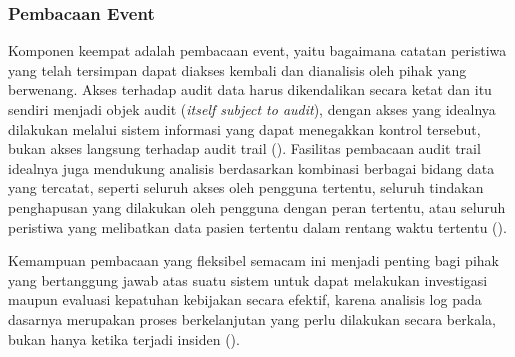 \subsubsection{Pembacaan Event}
\label{subsubsec:pembacaan-event}

Komponen keempat adalah pembacaan event, yaitu bagaimana catatan peristiwa yang telah tersimpan dapat diakses kembali dan dianalisis oleh pihak yang berwenang. Akses terhadap audit data harus dikendalikan secara ketat dan itu sendiri menjadi objek audit (\textit{itself subject to audit}), dengan akses yang idealnya dilakukan melalui sistem informasi yang dapat menegakkan kontrol tersebut, bukan akses langsung terhadap audit trail (\cite{iso27789_2021}). Fasilitas pembacaan audit trail idealnya juga mendukung analisis berdasarkan kombinasi berbagai bidang data yang tercatat, seperti seluruh akses oleh pengguna tertentu, seluruh tindakan penghapusan yang dilakukan oleh pengguna dengan peran tertentu, atau seluruh peristiwa yang melibatkan data pasien tertentu dalam rentang waktu tertentu (\cite{iso27789_2021}).

Kemampuan pembacaan yang fleksibel semacam ini menjadi penting bagi pihak yang bertanggung jawab atas suatu sistem untuk dapat melakukan investigasi maupun evaluasi kepatuhan kebijakan secara efektif, karena analisis log pada dasarnya merupakan proses berkelanjutan yang perlu dilakukan secara berkala, bukan hanya ketika terjadi insiden (\cite{nist80092}).


